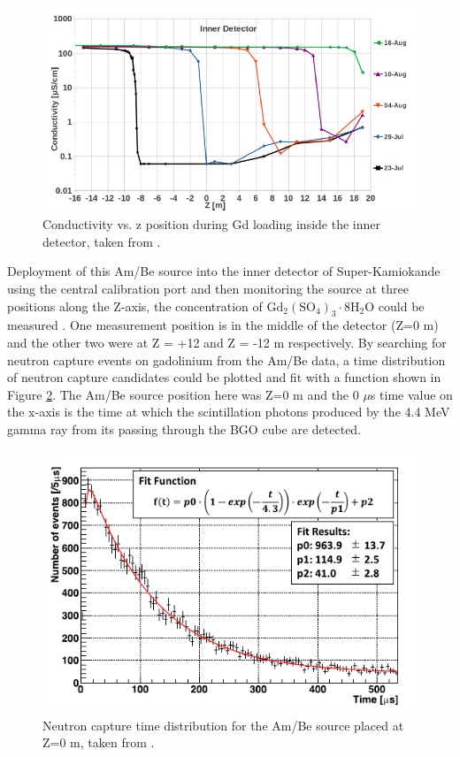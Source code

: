 \begin{figure}
    \includegraphics[width=\textwidth]{Figures/gd_conductivity.png}
    \caption{Conductivity vs. z position during Gd loading inside the inner detector, taken from \cite{abe_first_2021}.}
    \label{fig:gdconductivity}
\end{figure}


Deployment of this Am/Be source into the inner detector of Super-Kamiokande using the central calibration port and then monitoring the source at three positions along the Z-axis, the concentration of $\mathrm{Gd}_{2}\left(\mathrm{SO}_{4}\right)_{3} \cdot 8 \mathrm{H}_{2} \mathrm{O}$ could be measured \cite{pronost2017looking}. One measurement position is in the middle of the detector (Z=0 m) and the other two were at Z = +12 and Z = -12 m respectively. By searching for neutron capture events on gadolinium from the Am/Be data, a time distribution of neutron capture candidates could be plotted and fit with a function shown in Figure \ref{fig:ambe_time}. The Am/Be source position here was Z=0 m and the 0 $\mu$s time value on the x-axis is the time at which the scintillation photons produced by the 4.4 MeV gamma ray from its passing through the BGO cube are detected. 


\begin{figure}
    \includegraphics[width=\textwidth]{Figures/ambe_time.png}
    \caption{Neutron capture time distribution for the Am/Be source placed at Z=0 m, taken from \cite{abe_first_2021}.}
    \label{fig:ambe_time}
\end{figure}

